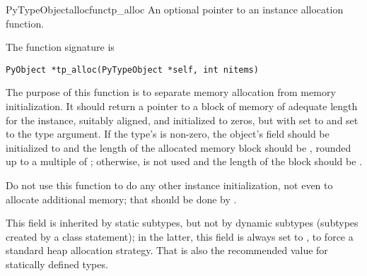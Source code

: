 \begin{cmemberdesc}{PyTypeObject}{allocfunc}{tp_alloc}
  An optional pointer to an instance allocation function.

  The function signature is

\begin{verbatim}
PyObject *tp_alloc(PyTypeObject *self, int nitems)
\end{verbatim}

  The purpose of this function is to separate memory allocation from
  memory initialization.  It should return a pointer to a block of
  memory of adequate length for the instance, suitably aligned, and
  initialized to zeros, but with  set to 
  and  set to the type argument.  If the type's
   is non-zero, the object's  field
  should be initialized to  and the length of the
  allocated memory block should be , rounded up to a multiple of
  ; otherwise,  is not used and the
  length of the block should be .

  Do not use this function to do any other instance initialization,
  not even to allocate additional memory; that should be done by
  .

  This field is inherited by static subtypes, but not by dynamic
  subtypes (subtypes created by a class statement); in the latter,
  this field is always set to , to
  force a standard heap allocation strategy.  That is also the
  recommended value for statically defined types.
\end{cmemberdesc}

